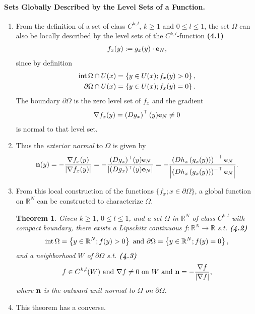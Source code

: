 \documentclass{book}
\numberwithin{equation}{section}
\newtheorem{theorem}{Theorem}[section]
\begin{document}
\paragraph{Sets Globally Described by the Level Sets of a Function.}
\begin{enumerate}
    \item From the definition of a set of class $C^{k,l}$, $k\ge 1$ and $0\le l\le 1$, the set $\Omega$ can also be locally described by the level sets of the $C^{k,l}$-function \textbf{(4.1)}
    \begin{align*}
        f_x(y) := g_x(y)\cdot {\bf e}_N,
    \end{align*}
    since by definition
    \begin{align*}
        {\rm int}\,\Omega\cap U(x) &= \left\{y\in U(x);f_x(y) > 0\right\},\\
        \partial\Omega\cap U(x) &= \left\{y\in U(x);f_x(y) = 0\right\}.
    \end{align*}
    The boundary $\partial\Omega$ is the zero level set of $f_x$ and the gradient
    \begin{align*}
        \nabla f_x(y) = \left(Dg_x\right)^\top(y){\bf e}_N\ne 0
    \end{align*}
    is normal to that level set.
    \item Thus the \textit{exterior normal} to $\Omega$ is given by
    \begin{align*}
        {\bf n}(y) = -\frac{\nabla f_x(y)}{\left|\nabla f_x(y)\right|} = -\frac{(Dg_x)^\top(y){\bf e}_N}{\left|(Dg_x)^\top(y){\bf e}_N\right|} = -\frac{\left(Dh_x\left(g_x(y)\right)\right)^{-\top}{\bf e}_N}{\left|\left(Dh_x\left(g_x(y)\right)\right)^{-\top}{\bf e}_N\right|}.
    \end{align*}
    \item From this local construction of the functions $\{f_x;x\in\partial\Omega\}$, a global function on $\mathbb{R}^N$ can be constructed to characterize $\Omega$.
    
    \begin{theorem}
        Given $k\ge 1$, $0\le l\le 1$, and a set $\Omega$ in $\mathbb{R}^N$ of class $C^{k,l}$ with compact boundary, there exists a Lipschitz continuous $f:\mathbb{R}^N\to\mathbb{R}$ s.t. \textbf{(4.2)}
        \begin{align*}
            {\rm int}\,\Omega = \left\{y\in\mathbb{R}^N;f(y) > 0\right\} \mbox{ and } \partial\Omega = \left\{y\in\mathbb{R}^N;f(y) = 0\right\},
        \end{align*}
        and a neighborhood $W$ of $\partial\Omega$ s.t. \textbf{(4.3)}
        \begin{align*}
            f\in C^{k,l}(W) \mbox{ and } \nabla f\ne 0 \mbox{ on } W \mbox{ and } {\bf n} = -\frac{\nabla f}{\left|\nabla f\right|},
        \end{align*}
        where ${\bf n}$ is the outward unit normal to $\Omega$ on $\partial\Omega$.
    \end{theorem}
    \item This theorem has a converse.
    

\end{enumerate}
\end{document}
